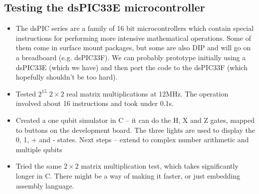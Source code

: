\documentclass{article}
\begin{document}

\subsection{Testing the dsPIC33E microcontroller}

\begin{itemize}
\item The dsPIC series are a family of 16 bit microcontrollers which contain special instructions for performing more intensive mathematical operations. Some of them come in surface mount packages, but some are also DIP and will go on a breadboard (e.g. dsPIC33F). We can probably prototype initially using a dsPIC33E (which we have) and then port the code to the dsPIC33F (which hopefully shouldn't be too hard).
\item Tested $2^{15}$ $2\times 2$ real matrix multiplications at 12MHz. The operation involved about 16 instructions and took under 0.1s.
\item Created a one qubit simulator in C -- it can do the H, X and Z gates, mapped to buttons on the development board. The three lights are used to display the 0, 1, + and - states. Next steps -- extend to complex number arithmetic and multiple qubits
\item Tried the same $2\times 2$ matrix multiplication test, which takes significantly longer in C. There might be a way of making it faster, or just embedding assembly language.
\end{itemize}
\end{document}
